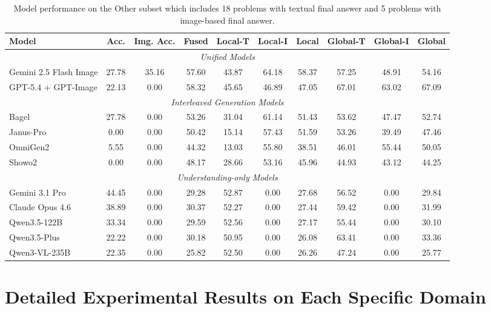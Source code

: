 \documentclass[11pt]{article}
\begin{document}
\begin{table}[t]
  \centering
  \small
  \begin{tabular}{lccccccccc}
    \toprule
    Model & Acc. & Img. Acc. & Fused & Local-T & Local-I & Local & Global-T & Global-I & Global \\
    \midrule
    \multicolumn{10}{c}{\textit{Unified Models}} \\
    \midrule
    Gemini 2.5 Flash Image & 27.78 & 35.16 & 57.60 & 43.87 & 64.18 & 58.37 & 57.25 & 48.91 & 54.16 \\
    GPT-5.4 + GPT-Image & 22.13 & 0.00 & 58.32 & 45.65 & 46.89 & 47.05 & 67.01 & 63.02 & 67.09 \\
    \midrule
    \multicolumn{10}{c}{\textit{Interleaved Generation Models}} \\
    \midrule
    Bagel & 27.78 & 0.00 & 53.26 & 31.04 & 61.14 & 51.43 & 53.62 & 47.47 & 52.74 \\
    Janus-Pro & 0.00 & 0.00 & 50.42 & 15.14 & 57.43 & 51.59 & 53.26 & 39.49 & 47.46 \\
    OmniGen2 & 5.55 & 0.00 & 44.32 & 13.03 & 55.80 & 38.51 & 46.01 & 55.44 & 50.05 \\
    Showo2 & 0.00 & 0.00 & 48.17 & 28.66 & 53.16 & 45.96 & 44.93 & 43.12 & 44.25 \\
    \midrule
    \multicolumn{10}{c}{\textit{Understanding-only Models}} \\
    \midrule
    Gemini 3.1 Pro & 44.45 & 0.00 & 29.28 & 52.87 & 0.00 & 27.68 & 56.52 & 0.00 & 29.84 \\
    Claude Opus 4.6 & 38.89 & 0.00 & 30.37 & 52.27 & 0.00 & 27.44 & 59.42 & 0.00 & 31.99 \\
    Qwen3.5-122B & 33.34 & 0.00 & 29.59 & 52.56 & 0.00 & 27.17 & 55.44 & 0.00 & 30.10 \\
    Qwen3.5-Plus & 22.22 & 0.00 & 30.18 & 50.95 & 0.00 & 26.08 & 63.41 & 0.00 & 33.36 \\
    Qwen3-VL-235B & 22.35 & 0.00 & 25.82 & 52.50 & 0.00 & 26.26 & 47.24 & 0.00 & 25.77 \\
    \bottomrule
  \end{tabular}
  \caption{Model performance on the Other subset which includes 18 problems with textual final answer and 5 problems with image-based final answer.}
  \label{tab:domain_bio_oth_metrics}
\end{table}

\section{Detailed Experimental Results on Each Specific Domain}
\end{document}
